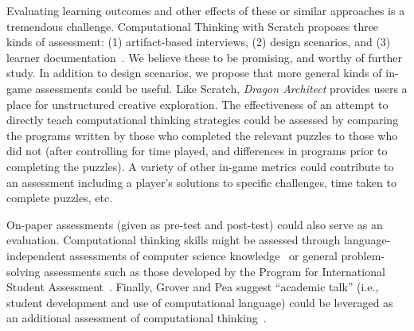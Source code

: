 \documentclass{sig-alternate}
\newcommand{\TODO}[1]{{\color{red} TODO: #1}}
\begin{document}
Evaluating learning outcomes and other effects of these or similar approaches is a tremendous challenge. 
Computational Thinking with Scratch proposes three kinds of assessment: (1) artifact-based interviews, (2) design scenarios, and (3) learner documentation~\cite{scratchedCT}. 
We believe these to be promising, and worthy of further study. 
In addition to design scenarios, we propose that more general kinds of in-game assessments could be useful. 
Like Scratch, \emph{Dragon Architect} provides users a place for unstructured creative exploration. 
The effectiveness of an attempt to directly teach computational thinking strategies could be assessed by comparing the programs written by those who completed the relevant puzzles to those who did not (after controlling for time played, and differences in programs prior to completing the puzzles).
A variety of other in-game metrics could contribute to an assessment including a player's solutions to specific challenges, time taken to complete puzzles, etc. 

On-paper assessments (given as pre-test and post-test) could also serve as an evaluation.
Computational thinking skills might be assessed through language-independent assessments of computer science knowledge~\cite{tew2011fcs1} or general problem-solving assessments such as those developed by the Program for International Student Assessment~\cite{pisa}. 
Finally, Grover and Pea suggest ``academic talk'' (i.e., student development and use of computational language) could be leveraged as an additional assessment of computational thinking~\cite{grover2013computational}. 



 
\end{document}
